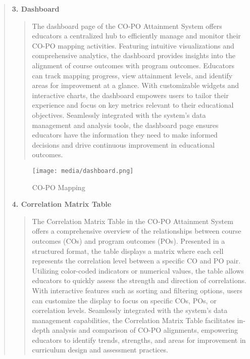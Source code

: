 \documentclass[12pt]{report}
\begin{document}
\begin{quote}
		\textbf{3. Dashboard}\\
		\begin{quote}
			The dashboard page of the CO-PO Attainment System offers educators a centralized hub to efficiently manage and monitor their CO-PO mapping activities. Featuring intuitive visualizations and comprehensive analytics, the dashboard provides insights into the alignment of course outcomes with program outcomes. Educators can track mapping progress, view attainment levels, and identify areas for improvement at a glance. With customizable widgets and interactive charts, the dashboard empowers users to tailor their experience and focus on key metrics relevant to their educational objectives. Seamlessly integrated with the system's data management and analysis tools, the dashboard page ensures educators have the information they need to make informed decisions and drive continuous improvement in educational outcomes.
			\\[3ex]
			
			
		\end{quote}
		
		\begin{figure}[h]
			\centering
			\texttt{[image: media/dashboard.png]}\\
			\caption{CO-PO Mapping}
			\vspace{0.5cm}
		\end{figure}
		\clearpage
		
		
		\textbf{4. Correlation Matrix Table}\\
		\begin{quote}
			The Correlation Matrix Table in the CO-PO Attainment System offers a comprehensive overview of the relationships between course outcomes (COs) and program outcomes (POs). Presented in a structured format, the table displays a matrix where each cell represents the correlation level between a specific CO and PO pair. Utilizing color-coded indicators or numerical values, the table allows educators to quickly assess the strength and direction of correlations. With interactive features such as sorting and filtering options, users can customize the display to focus on specific COs, POs, or correlation levels. Seamlessly integrated with the system's data management capabilities, the Correlation Matrix Table facilitates in-depth analysis and comparison of CO-PO alignments, empowering educators to identify trends, strengths, and areas for improvement in curriculum design and assessment practices.
			\\[3ex]
			

\end{quote}
\end{quote}
\end{document}
